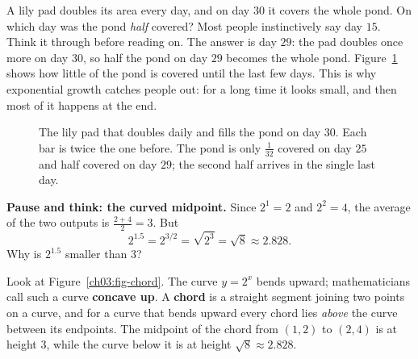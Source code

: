 \begin{walkbox}
A lily pad doubles its area every day, and on day $30$ it covers the whole pond. On which day was the pond \emph{half} covered? Most people instinctively say day $15$. Think it through before reading on. The answer is day $29$: the pad doubles once more on day $30$, so half the pond on day $29$ becomes the whole pond. Figure~\ref{ch03:fig-lily} shows how little of the pond is covered until the last few days. This is why exponential growth catches people out: for a long time it looks small, and then most of it happens at the end.
\end{walkbox}

\begin{figure}[htbp]
\centering
{}
\caption{The lily pad that doubles daily and fills the pond on day $30$. Each bar is twice the one before. The pond is only $\tfrac{1}{32}$ covered on day $25$ and half covered on day $29$; the second half arrives in the single last day.}
\label{ch03:fig-lily}
\end{figure}

\begin{recoverybox}
\textbf{Pause and think: the curved midpoint.} Since $2^1 = 2$ and $2^2 = 4$, the average of the two outputs is $\tfrac{2+4}{2} = 3$. But
\[
2^{1.5} = 2^{3/2} = \sqrt{2^3} = \sqrt{8} \approx 2.828.
\]
Why is $2^{1.5}$ smaller than $3$?

Look at Figure~\ref{ch03:fig-chord}. The curve $y=2^x$ bends upward; mathematicians call such a curve \textbf{concave up}. A \textbf{chord} is a straight segment joining two points on a curve, and for a curve that bends upward every chord lies \emph{above} the curve between its endpoints. The midpoint of the chord from $(1,2)$ to $(2,4)$ is at height $3$, while the curve below it is at height $\sqrt{8} \approx 2.828$.
\end{recoverybox}

